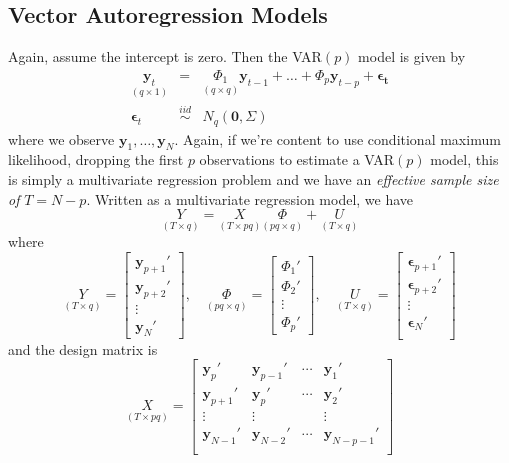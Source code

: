 \documentclass[12pt]{article}
\theoremstyle{definition}
\begin{document}
\subsection{Vector Autoregression Models}
Again, assume the intercept is zero. Then the VAR$(p)$ model is given by
	\begin{eqnarray*}
		\underset{(q\times 1)}{\textbf{y}_t} &=& \underset{(q\times q)}{\Phi_1} \textbf{y}_{t-1} + \hdots + \Phi_{p}\textbf{y}_{t-p} + \boldsymbol{\epsilon_t}\\
		\boldsymbol{\epsilon}_t &\overset{iid}{\sim}& N_q(\mathbf{0}, \Sigma)
	\end{eqnarray*}
where we observe $\mathbf{y}_1, \hdots, \mathbf{y}_N$. Again, if we're content to use conditional maximum likelihood, dropping the first $p$ observations to estimate a VAR$(p)$ model, this is simply a multivariate regression problem and we have an \emph{effective sample size of} $T = N-p$. Written as a multivariate regression model, we have 
	$$\underset{(T\times q)}{Y} = \underset{(T\times pq)}{X}\underset{(pq\times q)}{\Phi}  + \underset{(T\times q)}{U}$$
where 
	$$
	\underset{(T\times q)}{Y} = \left[\begin{array}
		{c} \textbf{y}_{p+1}' \\ \textbf{y}_{p+2}' \\
		\vdots \\ \textbf{y}_{N}' 
	\end{array} \right],\quad
	\underset{(pq\times q)}{\Phi} = \left[\begin{array}
		{c} \Phi_1' \\ \Phi_2' \\ \vdots \\ \Phi_p'
	\end{array} \right],\quad
	\underset{(T\times q)}{U} = \left[\begin{array}
		{c} \boldsymbol{\epsilon}_{p+1}' \\ 
		\boldsymbol{\epsilon}_{p+2}' \\ 
		\vdots \\ 
		\boldsymbol{\epsilon}_{N}' \\ 
	\end{array} \right]
	$$
and the design matrix is
$$\underset{(T\times pq)}{X} = \left[\begin{array}
		{cccc}
		\textbf{y}_p' & \textbf{y}_{p-1}' & \cdots & \textbf{y}_{1}'\\
		\textbf{y}_{p+1}' & \textbf{y}_{p}' & \cdots & \textbf{y}_{2}'\\
		\vdots & \vdots & &\vdots \\
		\textbf{y}_{N-1}' & \textbf{y}_{N-2}' & \cdots & \textbf{y}_{N-p-1}'\\
	\end{array} \right]$$
\end{document}
